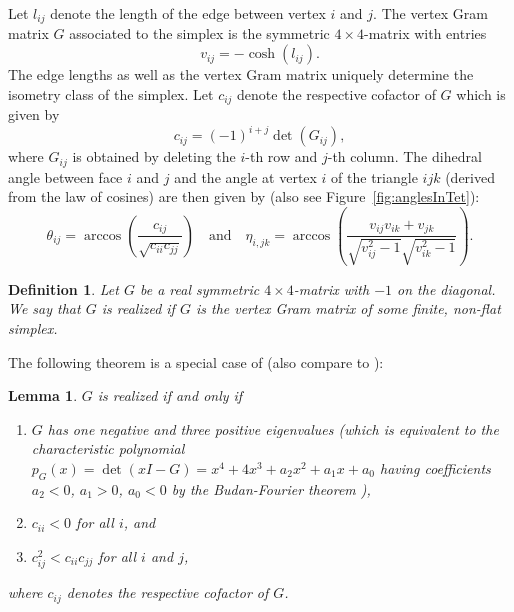 \documentclass[utopia,fullpage]{nmd/article}
\newtheorem{lemma}[theorem]{Lemma}
\newtheorem{definition}[theorem]{Definition}
\begin{document}
Let $l_{ij}$ denote the length of the edge between vertex $i$ and $j$. The vertex Gram matrix $G$ associated to the simplex is the symmetric $4\times 4$-matrix with entries $$v_{ij}=-\cosh(l_{ij}).$$ The edge lengths as well as the vertex Gram matrix uniquely determine the isometry class of the simplex. Let $c_{ij}$ denote the respective cofactor of $G$ which is given by
$$c_{ij}=(-1)^{i+j} \det(G_{ij}), $$
where $G_{ij}$ is obtained by deleting the $i$-th row and $j$-th column. The dihedral angle between face $i$ and $j$ and the angle at vertex $i$ of the triangle $ijk$ (derived from the law of cosines) are then given by (also see Figure~\ref{fig:anglesInTet}):
\begin{equation}
\theta_{ij}=\arccos\left(\frac{c_{ij}}{\sqrt{c_{ii}c_{jj}}}\right) \quad\mbox{and}\quad \eta_{i,jk}=\arccos\left(\frac{v_{ij}v_{ik}+v_{jk}}{\sqrt{v_{ij}^2-1}\sqrt{v_{ik}^2-1}}\right). \label{eqn:dihedral}
\end{equation}

\begin{definition}
Let $G$ be a real symmetric $4\times 4$-matrix with $-1$ on the diagonal. We say that $G$ is realized if $G$ is the vertex Gram matrix of some finite, non-flat simplex.
\end{definition}

The following theorem is a special case of \cite[Theorem~1.5]{heardThesis} (also compare to \cite[Theorem~7.2.2]{ratcliffe:hyp}):
\begin{lemma}
$G$ is realized if and only if
\begin{enumerate}
\item $G$ has one negative and three positive eigenvalues (which is equivalent to the characteristic polynomial $p_G(x)=\det(x I - G)=x^4+4x^3+a_2x^2+a_1x+a_0$ having coefficients $a_2 < 0$, $a_1>0$, $a_0<0$ by the Budan-Fourier theorem \cite{algRealGeom}),
\item $c_{ii}<0$ for all $i$, and\label{item:condNegAdj}
\item $c^2_{ij} < c_{ii} c_{jj}$ for all $i$ and $j$,\label{item:wellDefinedCos}
\end{enumerate}
where $c_{ij}$ denotes the respective cofactor of $G$. \label{lemma:singleGeomSimp}
\end{lemma}
\end{document}
